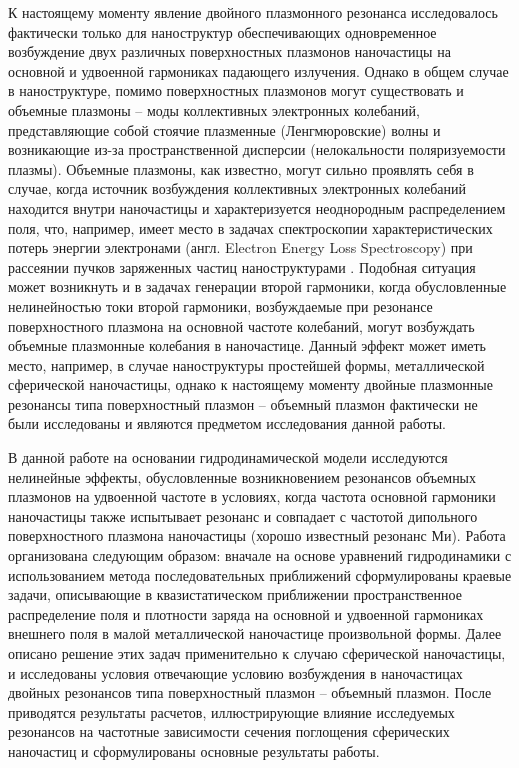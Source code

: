 \documentclass[12pt, a4paper]{article}
\begin{document}
К настоящему моменту явление двойного плазмонного резонанса исследовалось фактически только для наноструктур обеспечивающих одновременное возбуждение двух различных поверхностных плазмонов наночастицы на основной и удвоенной гармониках падающего излучения.
Однако в общем случае в наноструктуре, помимо поверхностных плазмонов могут существовать и объемные плазмоны \cite{Elibol2022,Gildenburg2016,Ruppin1975,Gildenburg1965} -- моды коллективных электронных колебаний, представляющие собой стоячие плазменные (Ленгмюровские) волны и возникающие из-за пространственной дисперсии (нелокальности поляризуемости плазмы). Объемные плазмоны, как известно, могут сильно проявлять себя в случае, когда источник возбуждения коллективных электронных колебаний находится внутри наночастицы и характеризуется неоднородным распределением поля, что, например, имеет место в задачах спектроскопии характеристических потерь энергии электронами (англ. Electron Energy Loss Spectroscopy) при рассеянии пучков заряженных частиц наноструктурами
\cite{Gildenburg2016, Kryshtal2025}. 
Подобная ситуация может возникнуть и в задачах генерации второй гармоники, когда обусловленные нелинейностью токи второй гармоники, возбуждаемые при резонансе поверхностного плазмона на основной частоте колебаний, могут возбуждать объемные плазмонные колебания в наночастице. Данный эффект может иметь место, например, в случае наноструктуры простейшей формы, металлической сферической наночастицы, однако к настоящему моменту двойные плазмонные резонансы типа поверхностный плазмон -- объемный плазмон фактически не были исследованы и являются предметом исследования данной работы.

В данной работе на основании гидродинамической модели \cite{Haas2011, Boardman1982, Manfredi2021} исследуются нелинейные эффекты, обусловленные возникновением резонансов объемных плазмонов на удвоенной частоте в условиях, когда частота основной гармоники наночастицы также испытывает резонанс и совпадает с частотой дипольного поверхностного плазмона наночастицы (хорошо известный резонанс Ми). Работа организована следующим образом: вначале на основе уравнений гидродинамики с использованием метода последовательных приближений сформулированы краевые задачи, описывающие в квазистатическом приближении пространственное распределение поля и плотности заряда на основной и удвоенной гармониках внешнего поля в малой металлической наночастице произвольной формы. Далее описано решение этих задач применительно к случаю сферической наночастицы, и исследованы условия отвечающие условию возбуждения в наночастицах двойных резонансов типа поверхностный плазмон – объемный плазмон. После приводятся результаты расчетов, иллюстрирующие влияние исследуемых резонансов на частотные зависимости сечения поглощения сферических наночастиц и сформулированы основные результаты работы.
\end{document}
